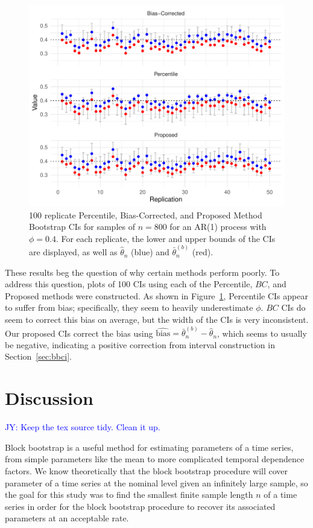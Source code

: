 \documentclass[12pt, letterpaper, titlepage]{article}
\newcommand{\jy}[1]{\textcolor{blue}{JY: #1}}
\begin{document}
\begin{figure}[tbp]
  \centering
  \includegraphics[width=\textwidth]{figures/norm_phi_intervals}
  \caption{100 replicate Percentile, Bias-Corrected, and Proposed Method
  Bootstrap CIs for samples of $n = 800$ for
    an AR(1) process with $\phi = 0.4$. For each replicate, the lower and upper
    bounds
    of the CIs are displayed, as well as $\hat\theta_n$ (blue) and $
    \bar\theta_n^{(b)}$ (red). }
  \label{fig:npi}
\end{figure}


These results beg the question of why certain methods perform poorly. To
address 
this question, plots of 100 CIs using each of the Percentile, $BC$, and Proposed 
methods were constructed. As shown in Figure~\ref{fig:npi}, Percentile CIs
appear to suffer from bias; specifically, they seem to heavily underestimate
$\phi$. $BC$ CIs do seem to correct this bias on average, but the width of the
CIs is very inconsistent. Our proposed CIs correct the bias using 
$\widehat{\text{bias}} = \bar\theta_n^{(b)} -  \hat\theta_n$,
which seems to usually be negative, indicating a positive 
correction from interval construction in Section~\ref{sec:bbci}.


\section{Discussion}
\label{sec:disc}


\jy{Keep the tex source tidy. Clean it up.}


Block bootstrap is a useful method for estimating parameters of a time
series, from simple parameters like the mean to more complicated temporal
 dependence factors.
 We know theoretically that the block bootstrap procedure will cover
  parameter of a time series at the nominal level given an
 infinitely large
sample, so the goal for this study was to find the smallest finite
sample length $n$ of a time series in order for the block bootstrap procedure
to 
recover its associated parameters at an acceptable rate.
\end{document}
